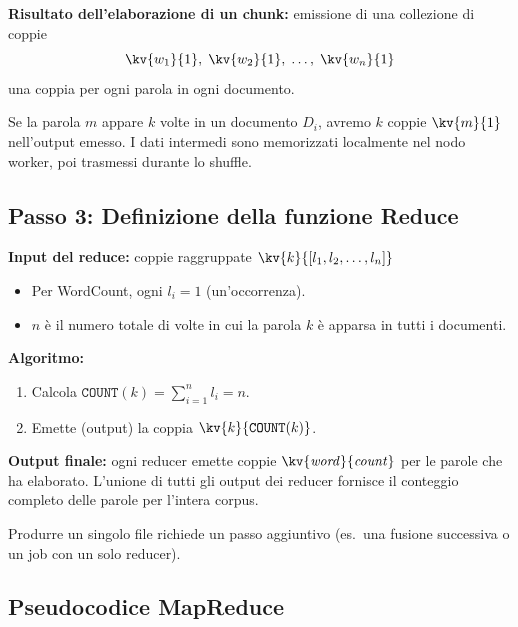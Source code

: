 \textbf{Risultato dell'elaborazione di un chunk:} emissione di una
collezione di coppie
\[
  \kv{w_1}{1},\; \kv{w_2}{1},\; \ldots,\; \kv{w_n}{1}
\]
una coppia per ogni parola in ogni documento.

\begin{nota}
  Se la parola $m$ appare $k$ volte in un documento $D_i$, avremo $k$
  coppie $\kv{m}{1}$ nell'output emesso. I dati intermedi sono memorizzati
  localmente nel nodo worker, poi trasmessi durante lo shuffle.
\end{nota}

\subsection{Passo 3: Definizione della funzione Reduce}

\textbf{Input del reduce:} coppie raggruppate $\kv{k}{[l_1, l_2, \ldots, l_n]}$
\begin{itemize}
  \item Per WordCount, ogni $l_i = 1$ (un'occorrenza).
  \item $n$ è il numero totale di volte in cui la parola $k$ è apparsa
    in tutti i documenti.
\end{itemize}

\textbf{Algoritmo:}
\begin{enumerate}
  \item Calcola $\texttt{COUNT}(k) = \sum_{i=1}^{n} l_i = n$.
  \item Emette (output) la coppia $\kv{k}{\texttt{COUNT}(k)}$.
\end{enumerate}

\textbf{Output finale:} ogni reducer emette coppie $\kv{\mathit{word}}{\mathit{count}}$
per le parole che ha elaborato. L'unione di tutti gli output dei reducer fornisce
il conteggio completo delle parole per l'intera corpus.

\begin{nota}
  Produrre un singolo file richiede un passo aggiuntivo (es.\ una fusione
  successiva o un job con un solo reducer).
\end{nota}

\subsection{Pseudocodice MapReduce}

